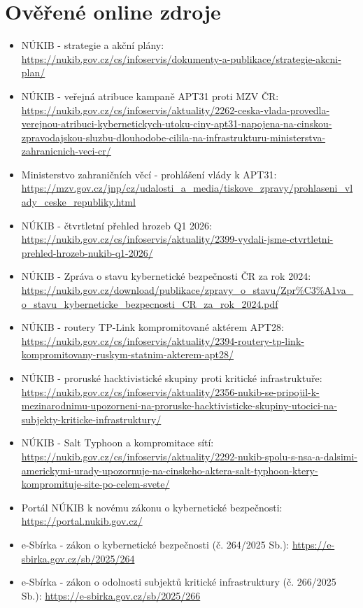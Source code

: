 \documentclass[11pt,a4paper]{article}
\begin{document}
\section*{Ověřené online zdroje}
\begin{itemize}
  \item NÚKIB - strategie a akční plány: \url{https://nukib.gov.cz/cs/infoservis/dokumenty-a-publikace/strategie-akcni-plan/}
  \item NÚKIB - veřejná atribuce kampaně APT31 proti MZV ČR: \url{https://nukib.gov.cz/cs/infoservis/aktuality/2262-ceska-vlada-provedla-verejnou-atribuci-kybernetickych-utoku-ciny-apt31-napojena-na-cinskou-zpravodajskou-sluzbu-dlouhodobe-cilila-na-infrastrukturu-ministerstva-zahranicnich-veci-cr/}
  \item Ministerstvo zahraničních věcí - prohlášení vlády k APT31: \url{https://mzv.gov.cz/jnp/cz/udalosti_a_media/tiskove_zpravy/prohlaseni_vlady_ceske_republiky.html}
  \item NÚKIB - čtvrtletní přehled hrozeb Q1 2026: \url{https://nukib.gov.cz/cs/infoservis/aktuality/2399-vydali-jsme-ctvrtletni-prehled-hrozeb-nukib-q1-2026/}
  \item NÚKIB - Zpráva o stavu kybernetické bezpečnosti ČR za rok 2024: \url{https://nukib.gov.cz/download/publikace/zpravy_o_stavu/Zpr%C3%A1va_o_stavu_kyberneticke_bezpecnosti_CR_za_rok_2024.pdf}
  \item NÚKIB - routery TP-Link kompromitované aktérem APT28: \url{https://nukib.gov.cz/cs/infoservis/aktuality/2394-routery-tp-link-kompromitovany-ruskym-statnim-akterem-apt28/}
  \item NÚKIB - proruské hacktivistické skupiny proti kritické infrastruktuře: \url{https://nukib.gov.cz/cs/infoservis/aktuality/2356-nukib-se-pripojil-k-mezinarodnimu-upozorneni-na-proruske-hacktivisticke-skupiny-utocici-na-subjekty-kriticke-infrastruktury/}
  \item NÚKIB - Salt Typhoon a kompromitace sítí: \url{https://nukib.gov.cz/cs/infoservis/aktuality/2292-nukib-spolu-s-nsa-a-dalsimi-americkymi-urady-upozornuje-na-cinskeho-aktera-salt-typhoon-ktery-kompromituje-site-po-celem-svete/}
  \item Portál NÚKIB k novému zákonu o kybernetické bezpečnosti: \url{https://portal.nukib.gov.cz/}
  \item e-Sbírka - zákon o kybernetické bezpečnosti (č. 264/2025 Sb.): \url{https://e-sbirka.gov.cz/sb/2025/264}
  \item e-Sbírka - zákon o odolnosti subjektů kritické infrastruktury (č. 266/2025 Sb.): \url{https://e-sbirka.gov.cz/sb/2025/266}

\end{itemize}
\end{document}
